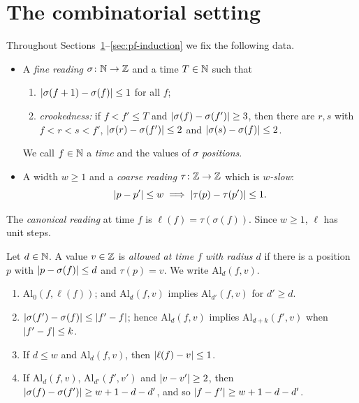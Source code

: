 \section{The combinatorial setting}\label{sec:pf-setting}

Throughout Sections~\ref{sec:pf-setting}--\ref{sec:pf-induction} we fix the following data.

\begin{itemize}
\item A \emph{fine reading} $\sigma\colon\mathbb{N}\to\mathbb{Z}$ and a time $T\in\mathbb{N}$ such that
\begin{enumerate}[label=(S\arabic*)]
\item\label{S:lip} $\left\lvert \sigma(f+1)-\sigma(f)\right\rvert\le1$ for all $f$;
\item\label{S:crook} \emph{crookedness:} if $f<f'\le T$ and $\left\lvert \sigma(f)-\sigma(f')\right\rvert\ge3$, then there are
$r,s$ with $f<r<s<f'$, $\left\lvert \sigma(r)-\sigma(f')\right\rvert\le2$ and $\left\lvert \sigma(s)-\sigma(f)\right\rvert\le2$.
\end{enumerate}
We call $f\in\mathbb{N}$ a \emph{time} and the values of $\sigma$ \emph{positions}.
\item A width $w\ge1$ and a \emph{coarse reading} $\tau\colon\mathbb{Z}\to\mathbb{Z}$ which is \emph{$w$-slow}:
\[
\left\lvert p-p'\right\rvert\le w\implies\left\lvert \tau(p)-\tau(p')\right\rvert\le1 .
\]
\end{itemize}

The \emph{canonical reading} at time $f$ is $\ell(f)=\tau(\sigma(f))$. Since $w\ge1$, $\ell$ has unit steps.

\begin{definition}\label{def:allowed}
Let $d\in\mathbb{N}$. A value $v\in\mathbb{Z}$ is \emph{allowed at time $f$ with radius $d$} if there is a position $p$
with $\left\lvert p-\sigma(f)\right\rvert\le d$ and $\tau(p)=v$. We write $\mathrm{Al}_d(f,v)$.
\end{definition}

\begin{lemma}\label{lem:allowed}
\begin{enumerate}[label=(\alph*)]
\item $\mathrm{Al}_0(f,\ell(f))$; and $\mathrm{Al}_d(f,v)$ implies $\mathrm{Al}_{d'}(f,v)$ for $d'\ge d$.
\item $\left\lvert \sigma(f')-\sigma(f)\right\rvert\le\left\lvert f'-f\right\rvert$; hence $\mathrm{Al}_d(f,v)$ implies $\mathrm{Al}_{d+k}(f',v)$ when
$\left\lvert f'-f\right\rvert\le k$.
\item If $d\le w$ and $\mathrm{Al}_d(f,v)$, then $\left\lvert \ell(f)-v\right\rvert\le1$.
\item If $\mathrm{Al}_d(f,v)$, $\mathrm{Al}_{d'}(f',v')$ and $\left\lvert v-v'\right\rvert\ge2$, then
$\left\lvert \sigma(f)-\sigma(f')\right\rvert\ge w+1-d-d'$, and so $\left\lvert f-f'\right\rvert\ge w+1-d-d'$.
\end{enumerate}
\end{lemma}

